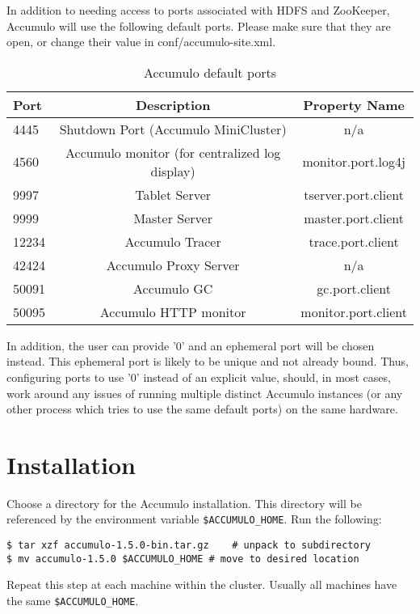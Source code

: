 In addition to needing access to ports associated with HDFS and ZooKeeper, Accumulo will
use the following default ports. Please make sure that they are open, or change
their value in conf/accumulo-site.xml.

\begin{table}[t]
\centering
\begin{tabular}{|l|c|c|}
\hline
Port & Description & Property Name\\
\hline
4445 & Shutdown Port (Accumulo MiniCluster) & n/a\\
\hline
4560 & Accumulo monitor (for centralized log display) & monitor.port.log4j\\
\hline
9997 & Tablet Server & tserver.port.client\\
\hline
9999 & Master Server & master.port.client\\
\hline
12234 & Accumulo Tracer & trace.port.client\\
\hline
42424 & Accumulo Proxy Server & n/a\\
\hline
50091 & Accumulo GC & gc.port.client\\
\hline
50095 & Accumulo HTTP monitor & monitor.port.client\\
\hline
\end{tabular}
\caption{Accumulo default ports}
\label{tab:template}
\end{table}

In addition, the user can provide '0' and an ephemeral port will be chosen instead. This
ephemeral port is likely to be unique and not already bound. Thus, configuring ports to
use '0' instead of an explicit value, should, in most cases, work around any issues of
running multiple distinct Accumulo instances (or any other process which tries to use the
same default ports) on the same hardware.

\section{Installation}
Choose a directory for the Accumulo installation. This directory will be referenced
by the environment variable \texttt{\$ACCUMULO\_HOME}. Run the following:

\begingroup\fontsize{8pt}{8pt}\selectfont\begin{verbatim}
$ tar xzf accumulo-1.5.0-bin.tar.gz    # unpack to subdirectory
$ mv accumulo-1.5.0 $ACCUMULO_HOME # move to desired location
\end{verbatim}\endgroup

Repeat this step at each machine within the cluster. Usually all machines have the
same \texttt{\$ACCUMULO\_HOME}.

